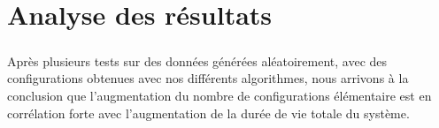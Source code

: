 \chapter{Analyse des résultats}

\paragraph{}
    Après plusieurs tests sur des données générées aléatoirement, avec des
    configurations obtenues avec nos différents algorithmes, nous arrivons
    à la conclusion que l'augmentation du nombre de configurations élémentaire
    est en corrélation forte avec l'augmentation de la durée de vie totale du
    système.